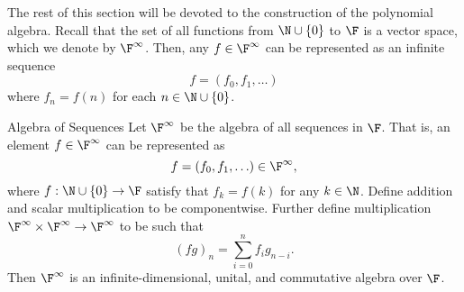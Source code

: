 \documentclass[linearalgebra]{subfiles}
\begin{document}
    \begin{remark}
        The rest of this section will be devoted to the construction of the polynomial algebra. Recall that the set of all functions from $\N\cup \left\lbrace 0 \right\rbrace$ to $\F$ is a vector space, which we denote by $\F^\infty$. Then, any $f\in\F^\infty$ can be represented as an infinite sequence
        \begin{equation*}
            f = \left( f_0, f_1, \ldots \right) 
        \end{equation*}
        where $f_n = f(n)$ for each $n\in\N\cup \left\lbrace 0 \right\rbrace$.
    \end{remark}

    \begin{prop}{Algebra of Sequences}
        Let $\F^\infty$ be the algebra of all sequences in $\F$. That is, an element $f\in \F^\infty$ can be represented as
        \begin{equation*}
            f = \left( f_0, f_1, \ldots \right) \in \F^\infty, 
        \end{equation*}
        where $f: \N\cup \left\lbrace 0 \right\rbrace \to \F$ satisfy that $f_k = f(k)$ for any $k\in \N$. Define addition and scalar multiplication to be componentwise. Further define multiplication $\F^\infty\times\F^\infty\to\F^\infty$ to be such that
        \begin{equation*}
            \left( fg \right)_n = \sum^n_{i=0} f_ig_{n-i}.
        \end{equation*}
        Then $\F^\infty$ is an infinite-dimensional, unital, and commutative algebra over $\F$.
    \end{prop}
\end{document}
